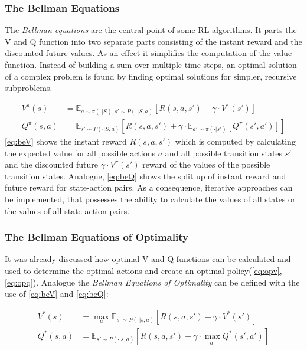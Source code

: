\subsubsection{The Bellman Equations}
The \emph{Bellman equations} are the central point of some RL algorithms. It parts the V and Q function into two
separate parts consisting of the instant reward and the discounted future values. As an effect it simplifies the computation of the value function. Instead of building a sum over multiple time steps, an optimal solution of a complex problem is found by finding optimal solutions for simpler, recursive subproblems.

\begin{align}
	V^{\pi} (s) &= \mathbb{E}_{a \sim \pi (\cdot | S), s' \sim P(\cdot | S,a)} [R(s,a,s') + \gamma \cdot V^{\pi}(s')] \label{eq:beV} \\
	Q^{\pi} (s,a) &= \mathbb{E}_{s' \sim P(\cdot |S,a)} [R(s,a,s') + \gamma \cdot  \mathbb{E}_{a' \sim \pi (\cdot | s')}[Q^{\pi}(s',a')]] \label{eq:beQ}
\end{align}
\newline
\cref{eq:beV} shows the instant reward $R(s,a,s')$ which is computed by calculating the expected value for all possible actions $a$ and all possible transition states $s'$ and the discounted future $\gamma \cdot V^{\pi} (s')$ reward of the values of the possible transition states. Analogue, \cref{eq:beQ} shows the split up of instant reward and future reward for state-action pairs. As a consequence, iterative approaches can be implemented, that possesses the ability to calculate the values of all states or the values of all state-action pairs. 

\subsubsection{The Bellman Equations of Optimality}
It was already discussed how optimal V and Q functions can be calculated and used to determine the optimal actions and create an optimal policy(\cref{eq:opv}, \cref{eq:opq}). Analogue the \emph{Bellman Equations of Optimality} can be defined with the use of \cref{eq:beV} and \cref{eq:beQ}:

\begin{align}
	V^*(s)  &= \max_a \mathbb{E}_{s' \sim P(\cdot | s,a)} [R(s,a,s') + \gamma \cdot V^*(s')] \label{eq:bopV}\\
	Q^*(s,a) &= \mathbb{E}_{s' \sim P(\cdot | s,a)} [R(s,a,s') + \gamma \cdot \max_{a'} Q^*(s',a')] \label{eq:bopQ}
\end{align}

